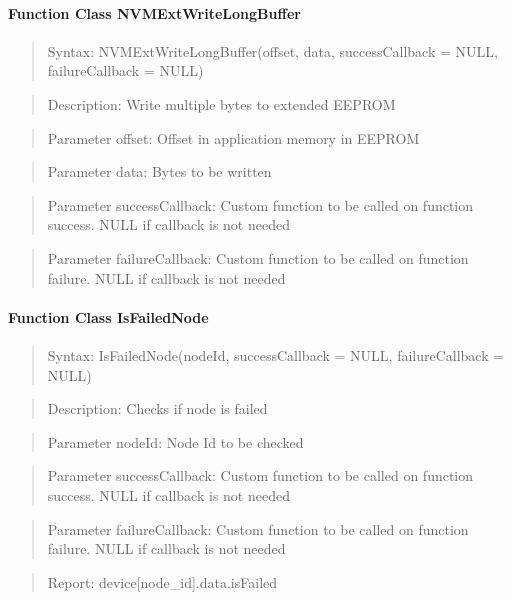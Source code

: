 \paragraph{Function Class NVMExtWriteLongBuffer}
\begin{quote}Syntax: NVMExtWriteLongBuffer(offset, data, successCallback = NULL, failureCallback = NULL)\end{quote}
\begin{quote}Description: Write multiple bytes to extended EEPROM\end{quote}
\begin{quote}Parameter offset: Offset in application memory in EEPROM\end{quote}
\begin{quote}Parameter data: Bytes to be written\end{quote}
\begin{quote}Parameter successCallback: Custom function to be called on function success. NULL if callback is not needed\end{quote}
\begin{quote}Parameter failureCallback: Custom function to be called on function failure. NULL if callback is not needed\end{quote}


\paragraph{Function Class IsFailedNode}
\begin{quote}Syntax: IsFailedNode(nodeId, successCallback = NULL, failureCallback = NULL)\end{quote}
\begin{quote}Description: Checks if node is failed\end{quote}
\begin{quote}Parameter nodeId: Node Id to be checked\end{quote}
\begin{quote}Parameter successCallback: Custom function to be called on function success. NULL if callback is not needed\end{quote}
\begin{quote}Parameter failureCallback: Custom function to be called on function failure. NULL if callback is not needed\end{quote}
\begin{quote}Report: device[node\_id].data.isFailed\end{quote}

